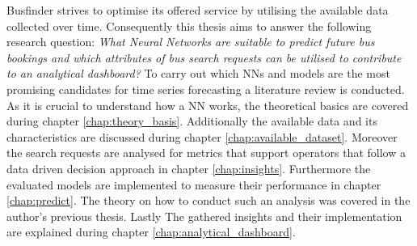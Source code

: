\newline
\newline
Busfinder strives to optimise its offered service by utilising the available data collected over time. 
Consequently this thesis aims to answer the following research question: \textit{What Neural Networks are suitable to predict future bus bookings and which attributes of bus search requests can be utilised to contribute to an analytical dashboard?}
To carry out which NNs and models are the most promising candidates for time series forecasting a literature review is conducted. As it is crucial to understand how a NN works, the theoretical basics are covered during chapter \ref{chap:theory_basis}. Additionally the available data and its characteristics are discussed during chapter \ref{chap:available_dataset}.
Moreover the search requests are analysed for metrics that support operators that follow a data driven decision approach in chapter \ref{chap:insights}. Furthermore the evaluated models are implemented to measure their performance in chapter \ref{chap:predict}.  The theory on how to conduct such an analysis was covered in the author's previous thesis. Lastly The gathered insights and their implementation are explained during chapter \ref{chap:analytical_dashboard}.


